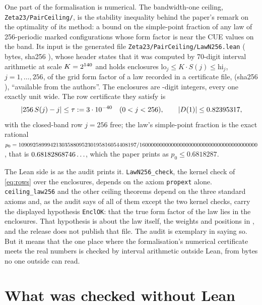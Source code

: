 \documentclass[preprint,11pt,authoryear,a4paper]{elsarticle}
\begin{document}
One part of the formalisation is numerical. The bandwidth-one ceiling, \texttt{Zeta23/PairCeiling/}, is the stability inequality behind the paper's remark on the optimality of its method: a bound on the simple-point fraction of any law of 256-periodic marked configurations whose form factor is near the CUE values on the band. Its input is the generated file \texttt{Zeta23/PairCeiling/LawN256.lean} (\RfLawLeanBytes{} bytes, sha256 \texttt{\RfLawLeanSha}), whose header states that it was computed by 70-digit interval arithmetic at scale $K=2^{140}$ and holds enclosures $\mathrm{lo}_j\le K\cdot S(j)\le\mathrm{hi}_j$, $j=1,\ldots,256$, of the grid form factor of a law recorded in a certificate file, \texttt{\RfLawFile} (sha256 \texttt{\RfLawFileSha}), ``available from the authors''. The enclosures are \RfKDigits-digit integers, every one exactly \RfEnclWidth{} unit wide. The row certificate they satisfy is
\begin{equation}\label{eq:rows}
|256\,S(j)-j|\le\tau:=3\cdot10^{-40}\quad(0<j<256),\qquad |D(1)|\le0.82395317,
\end{equation}
with the closed-band row $j=256$ free; the law's simple-point fraction is the exact rational $p_0=10909258999421303588\allowbreak 09523019581605440819\allowbreak 7/16000000000000000000\allowbreak 00000000000000000000\allowbreak 0$, that is $0.68182868746\ldots$, which the paper prints as $p_0\le0.6818287$.

The Lean side is as the audit prints it. \texttt{LawN256\_check}, the kernel check of \eqref{eq:rows} over the enclosures, depends on the axiom \texttt{propext} alone. \texttt{ceiling\_law256} and the other ceiling theorems depend on the three standard axioms and, as the audit says of all of them except the two kernel checks, carry the displayed hypothesis \texttt{EnclOK}: that the true form factor of the law lies in the enclosures. That hypothesis is about the law itself, the weights and positions in \texttt{\RfLawFile}, and the release does not publish that file. The audit is exemplary in saying so. But it means that the one place where the formalisation's numerical certificate meets the real numbers is checked by interval arithmetic outside Lean, from bytes no one outside can read.

\section{What was checked without Lean}\label{sec:checked}
\end{document}
